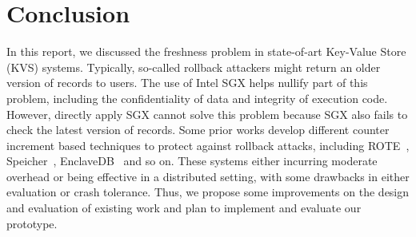 \section{Conclusion}
In this report, we discussed the freshness problem in state-of-art Key-Value Store (KVS) 
systems. Typically, so-called rollback attackers might return an older version of records 
to users. The use of Intel SGX helps nullify part of this problem, including the 
confidentiality of data and integrity of execution code. However, directly apply SGX
cannot solve this problem because SGX also fails to check the latest version of records. 
Some prior works develop different counter increment based techniques to protect against
rollback attacks, including ROTE~\cite{matetic2017rote}, Speicher~\cite{bailleu2019speicher}, EnclaveDB~\cite{enclavedb:sp18} and so on.
These systems either incurring moderate overhead or being effective in a distributed setting,
with some drawbacks in either evaluation or crash tolerance. 
Thus, we propose some improvements on the design and evaluation of existing work and plan 
to implement and evaluate our prototype.